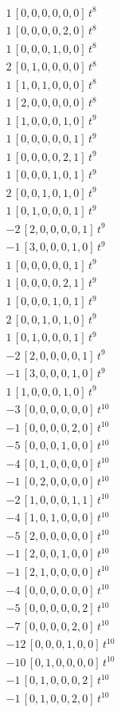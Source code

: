 \begin{align*}
1\,[0,0,0,0,0,0]\,t^{8} \\
1\,[0,0,0,0,2,0]\,t^{8} \\
1\,[0,0,0,1,0,0]\,t^{8} \\
2\,[0,1,0,0,0,0]\,t^{8} \\
1\,[1,0,1,0,0,0]\,t^{8} \\
1\,[2,0,0,0,0,0]\,t^{8} \\
1\,[1,0,0,0,1,0]\,t^{9} \\
1\,[0,0,0,0,0,1]\,t^{9} \\
1\,[0,0,0,0,2,1]\,t^{9} \\
1\,[0,0,0,1,0,1]\,t^{9} \\
2\,[0,0,1,0,1,0]\,t^{9} \\
1\,[0,1,0,0,0,1]\,t^{9} \\
-2\,[2,0,0,0,0,1]\,t^{9} \\
-1\,[3,0,0,0,1,0]\,t^{9} \\
1\,[0,0,0,0,0,1]\,t^{9} \\
1\,[0,0,0,0,2,1]\,t^{9} \\
1\,[0,0,0,1,0,1]\,t^{9} \\
2\,[0,0,1,0,1,0]\,t^{9} \\
1\,[0,1,0,0,0,1]\,t^{9} \\
-2\,[2,0,0,0,0,1]\,t^{9} \\
-1\,[3,0,0,0,1,0]\,t^{9} \\
1\,[1,0,0,0,1,0]\,t^{9} \\
-3\,[0,0,0,0,0,0]\,t^{10} \\
-1\,[0,0,0,0,2,0]\,t^{10} \\
-5\,[0,0,0,1,0,0]\,t^{10} \\
-4\,[0,1,0,0,0,0]\,t^{10} \\
-1\,[0,2,0,0,0,0]\,t^{10} \\
-2\,[1,0,0,0,1,1]\,t^{10} \\
-4\,[1,0,1,0,0,0]\,t^{10} \\
-5\,[2,0,0,0,0,0]\,t^{10} \\
-1\,[2,0,0,1,0,0]\,t^{10} \\
-1\,[2,1,0,0,0,0]\,t^{10} \\
-4\,[0,0,0,0,0,0]\,t^{10} \\
-5\,[0,0,0,0,0,2]\,t^{10} \\
-7\,[0,0,0,0,2,0]\,t^{10} \\
-12\,[0,0,0,1,0,0]\,t^{10} \\
-10\,[0,1,0,0,0,0]\,t^{10} \\
-1\,[0,1,0,0,0,2]\,t^{10} \\
-1\,[0,1,0,0,2,0]\,t^{10} \\

\end{align*}

